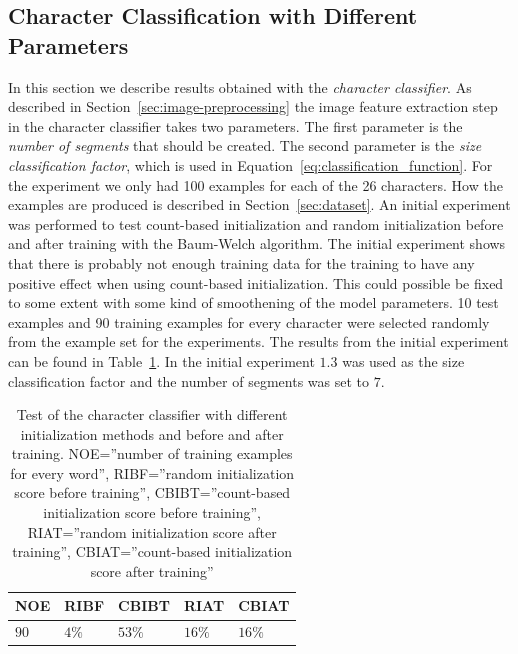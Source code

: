 \subsection{Character Classification with Different Parameters}\label{sec:character_classifier_results}
In this section we describe results obtained with the \textit{character classifier}.
As described in Section~\ref{sec:image-preprocessing} the image feature extraction step in the character classifier takes two parameters.
The first parameter is the \textit{number of segments} that should be created. 
The second parameter is the \textit{size classification factor}, which is used in Equation~\ref{eq:classification_function}. 
For the experiment we only had 100 examples for each of the 26 characters. 
How the examples are produced is described in Section~\ref{sec:dataset}. 
An initial experiment was performed to test count-based initialization and random initialization before and after training with the Baum-Welch algorithm.
The initial experiment shows that there is probably not enough training data for the training to have any positive effect when using count-based initialization. 
This could possible be fixed to some extent with some kind of smoothening of the model parameters. 
10 test examples and 90 training examples for every character were selected randomly from the example set for the experiments. 
The results from the initial experiment can be found in Table~\ref{tab:character_classifier_initial_experiment}. 
In the initial experiment $1.3$ was used as the size classification factor and the number of segments was set to $7$.


\begin{table}[htb]
  \begin{center}
  \begin{tabular}{ l l l l l }
    NOE    & RIBF   & CBIBT  & RIAT    & CBIAT \\ \hline
    $90$  & $4\%$ & $53\%$ & $16\%$  & $16\%$  \\   
  \end{tabular}
\end{center}
\caption{Test of the character classifier with different initialization methods and before and after training.
	 NOE=''number of training examples for every word'',
         RIBF=''random initialization score before training'',
         CBIBT=''count-based initialization score before training'',
         RIAT=''random initialization score after training'',
         CBIAT=''count-based initialization score after training''} 
\label{tab:character_classifier_initial_experiment} 
\end{table}

